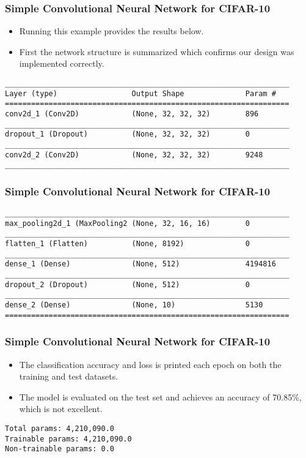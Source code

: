 \begin{frame}[fragile] \frametitle{Simple Convolutional Neural Network for CIFAR-10}

\begin{itemize}
\item Running this example provides the results below. 
\item First the network structure is summarized which confirms our design was implemented correctly.
\end{itemize}
\begin{lstlisting}
_________________________________________________________________
Layer (type)                 Output Shape              Param #  
=================================================================
conv2d_1 (Conv2D)            (None, 32, 32, 32)        896      
_________________________________________________________________
dropout_1 (Dropout)          (None, 32, 32, 32)        0        
_________________________________________________________________
conv2d_2 (Conv2D)            (None, 32, 32, 32)        9248      
_________________________________________________________________
\end{lstlisting}
\end{frame}

\begin{frame}[fragile] \frametitle{Simple Convolutional Neural Network for CIFAR-10}

\begin{lstlisting}
_________________________________________________________________
max_pooling2d_1 (MaxPooling2 (None, 32, 16, 16)        0        
_________________________________________________________________
flatten_1 (Flatten)          (None, 8192)              0        
_________________________________________________________________
dense_1 (Dense)              (None, 512)               4194816  
_________________________________________________________________
dropout_2 (Dropout)          (None, 512)               0        
_________________________________________________________________
dense_2 (Dense)              (None, 10)                5130      
=================================================================
\end{lstlisting}
\end{frame}


\begin{frame}[fragile] \frametitle{Simple Convolutional Neural Network for CIFAR-10}
\begin{itemize}
\item The classification accuracy and loss is printed each epoch on both the training and test datasets. 
\item The model is evaluated on the test set and achieves an accuracy of 70.85\%, which is not excellent.
\end{itemize}
\begin{lstlisting}
Total params: 4,210,090.0
Trainable params: 4,210,090.0
Non-trainable params: 0.0
\end{lstlisting}
\end{frame}

